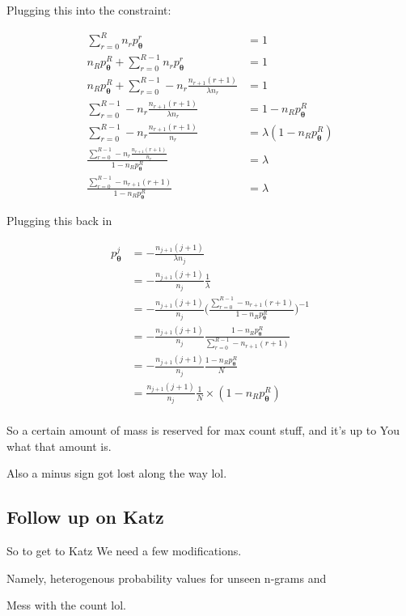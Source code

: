\documentclass{article}
\newcommand{\vtheta}{\boldsymbol{\theta}}
\newcommand{\model}{p_{\vtheta}}
\begin{document}
			Plugging this into the constraint:
			
			\begin{align}
				\sum^{R}_{r=0} n_r \model^r &= 1\\
				n_R\model^R + \sum^{R-1}_{r=0} n_r \model^r &= 1\\
				n_R\model^R + \sum^{R-1}_{r=0} -n_r \frac{n_{r+1} (r+1)}{\lambda n_r}&= 1\\
				 \sum^{R-1}_{r=0} -n_r \frac{n_{r+1} (r+1)}{\lambda n_r}&= 1 - n_R\model^R\\
				 \sum^{R-1}_{r=0} -n_r \frac{n_{r+1} (r+1)}{n_r}&= \lambda(1 - n_R\model^R)\\
				 \frac{\sum^{R-1}_{r=0} -n_r \frac{n_{r+1} (r+1)}{ n_r}}{1 - n_R\model^R} &= \lambda\\
				 \frac{\sum^{R-1}_{r=0} -n_{r+1} (r+1)}{1 - n_R\model^R} &= \lambda
			\end{align}
			
			Plugging this back in
			
			\begin{align}
				\model^{j}  &= -\frac{n_{j+1} (j+1)}{\lambda n_j}\\
				&= -\frac{n_{j+1} (j+1)}{ n_j}\frac{1}{\lambda}\\
				&= -\frac{n_{j+1} (j+1)}{ n_j}\bigg(\frac{\sum^{R-1}_{r=0} -n_{r+1} (r+1)}{1 - n_R\model^R} \bigg)^{-1}\\
				&= -\frac{n_{j+1} (j+1)}{ n_j} \frac{1 - n_R\model^R}{\sum^{R-1}_{r=0} -n_{r+1} (r+1)} \\
				&= -\frac{n_{j+1} (j+1)}{ n_j} \frac{1 - n_R\model^R}{N} \\
				&= \frac{n_{j+1} (j+1)}{ n_j} \frac{1}{N}\times (1 - n_R\model^R) \\
			\end{align}
			
			So a certain amount of mass is reserved for max count stuff, and it's up to You what that amount is.
			
			Also a minus sign got lost along the way lol.
			
	\subsection{Follow up on Katz}
	
		So to get to Katz We need a few modifications.
		
		Namely, heterogenous probability values for unseen n-grams and
		
		Mess with the count lol.
		
\end{document}

